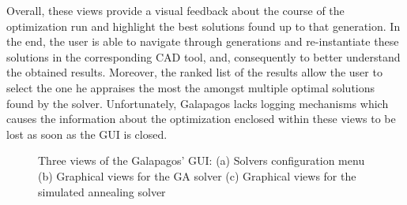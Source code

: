 Overall, these views provide a visual feedback about the course of the optimization run and highlight the best solutions found up to that generation. In the end, the user is able to navigate through generations and re-instantiate these solutions in the corresponding \ac{CAD} tool, and, consequently to better understand the obtained results. Moreover, the ranked list of the results allow the user to select the one he appraises the most the amongst multiple optimal solutions found by the solver. Unfortunately, Galapagos lacks logging mechanisms which causes the information about the optimization enclosed within these views to be lost as soon as the \ac{GUI} is closed. 
\begin{figure}[htbp]
	\centering
	\hfill
	\hfill
	
	\caption[Galapagos GUI]{ Three views of the Galapagos' \ac{GUI}: (a) Solvers configuration menu (b) Graphical views for the \ac{GA} solver (c) Graphical views for the simulated annealing solver}
	\label{fig:galapagos}
\end{figure}

